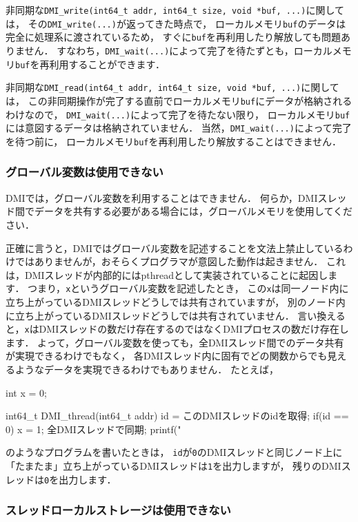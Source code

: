 \documentclass[report,12pt]{jsbook}
\begin{document}
非同期な\texttt{DMI\_write(int64\_t addr, int64\_t size, void *buf, ...)}に関しては，
その\texttt{DMI\_write(...)}が返ってきた時点で，
ローカルメモリ\texttt{buf}のデータは完全に処理系に渡されているため，
すぐに\texttt{buf}を再利用したり解放しても問題ありません．
すなわち，\texttt{DMI\_wait(...)}によって完了を待たずとも，ローカルメモリ\texttt{buf}を再利用することができます．

非同期な\texttt{DMI\_read(int64\_t addr, int64\_t size, void *buf, ...)}に関しては，
この非同期操作が完了する直前でローカルメモリ\texttt{buf}にデータが格納されるわけなので，
\texttt{DMI\_wait(...)}によって完了を待たない限り，
ローカルメモリ\texttt{buf}には意図するデータは格納されていません．
当然，\texttt{DMI\_wait(...)}によって完了を待つ前に，
ローカルメモリ\texttt{buf}を再利用したり解放することはできません．

\subsubsection{グローバル変数は使用できない}

DMIでは，グローバル変数を利用することはできません．
何らか，DMIスレッド間でデータを共有する必要がある場合には，グローバルメモリを使用してください．

正確に言うと，DMIではグローバル変数を記述することを文法上禁止しているわけではありませんが，おそらくプログラマが意図した動作は起きません．
これは，DMIスレッドが内部的にはpthreadとして実装されていることに起因します．
つまり，\texttt{x}というグローバル変数を記述したとき，
この\texttt{x}は同一ノード内に立ち上がっているDMIスレッドどうしでは共有されていますが，
別のノード内に立ち上がっているDMIスレッドどうしでは共有されていません．
言い換えると，\texttt{x}はDMIスレッドの数だけ存在するのではなくDMIプロセスの数だけ存在します．
よって，グローバル変数を使っても，全DMIスレッド間でのデータ共有が実現できるわけでもなく，
各DMIスレッド内に固有でどの関数からでも見えるようなデータを実現できるわけでもありません．
たとえば，
\begin{code}
int x = 0;

int64_t DMI_thread(int64_t addr)
{
  id = このDMIスレッドのidを取得;
  if(id == 0)
    {
      x = 1;
    }
  全DMIスレッドで同期;
  printf("%
}
\end{code}
のようなプログラムを書いたときは，
\texttt{id}が\texttt{0}のDMIスレッドと同じノード上に「たまたま」立ち上がっているDMIスレッドは\texttt{1}を出力しますが，
残りのDMIスレッドは\texttt{0}を出力します．


\subsubsection{スレッドローカルストレージは使用できない}
\end{document}

